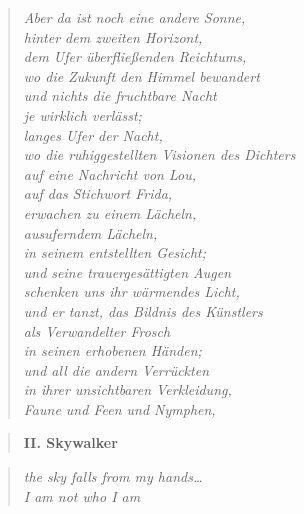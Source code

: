 \begin{verse}
\itshape
Aber da ist noch eine andere Sonne,\\
hinter dem zweiten Horizont,\\
dem Ufer überfließenden Reichtums,\\
wo die Zukunft den Himmel bewandert\\
und nichts die fruchtbare Nacht\\
je wirklich verlässt;\\
langes Ufer der Nacht,\\
wo die ruhiggestellten Visionen des Dichters\\
auf eine Nachricht von Lou,\\
auf das Stichwort {\upshape Frida},\\
erwachen zu einem Lächeln,\\
ausuferndem Lächeln,\\
in seinem entstellten Gesicht;\\
und seine trauergesättigten Augen\\
schenken uns ihr wärmendes Licht,\\
und er tanzt, das {\upshape Bildnis des Künstlers}\\
als Verwandelter Frosch\\
in seinen erhobenen Händen;\\
und all die andern Verrückten\\
in ihrer unsichtbaren Verkleidung,\\
Faune und Feen und Nymphen,
\end{verse}

\clearpage

\begin{verse}
{\bfseries II. Skywalker}
\end{verse}

\begin{quote}
\itshape
the sky falls from my hands\ldots\\
I am not who I am

\end{quote}

